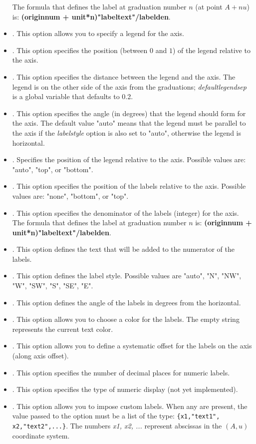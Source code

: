 \begin{itemize}
The formula that defines the label at graduation number $n$ (at point $A+nu$) is: \textbf{(originnum + unit*n)"labeltext"/labelden}.

    \item {}. This option allows you to specify a legend for the axis.
    \item {}. This option specifies the position (between $0$ and $1$) of the legend relative to the axis.
    \item {}. This option specifies the distance between the legend and the axis. The legend is on the other side of the axis from the graduations; \emph{defaultlegendsep} is a global variable that defaults to 0.2.
    \item {}. This option specifies the angle (in degrees) that the legend should form for the axis. The default value "auto" means that the legend must be parallel to the axis if the \emph{labelstyle} option is also set to "auto", otherwise the legend is horizontal.
    \item {}. Specifies the position of the legend relative to the axis. Possible values ​​are: "auto", "top", or "bottom".
    \item {}. This option specifies the position of the labels relative to the axis. Possible values ​​are: "none", "bottom", or "top".
    \item {}. This option specifies the denominator of the labels (integer) for the axis. The formula that defines the label at graduation number $n$ is: \textbf{(originnum + unit*n)"labeltext"/labelden}.
    \item {}. This option defines the text that will be added to the numerator of the labels.     \item {}. This option defines the label style. Possible values ​​are "auto", "N", "NW", "W", "SW", "S", "SE", "E".
    \item {}. This option defines the angle of the labels in degrees from the horizontal.
    \item {}. This option allows you to choose a color for the labels. The empty string represents the current text color.
    \item {}. This option allows you to define a systematic offset for the labels on the axis (along axis offset).
    \item {}. This option specifies the number of decimal places for numeric labels.
    \item {}. This option specifies the type of numeric display (not yet implemented).
    \item {}. This option allows you to impose custom labels. When any are present, the value passed to the option must be a list of the type: \verb|{x1,"text1", x2,"text2",...}|. The numbers \emph{x1, x2, ...} represent abscissas in the $(A,u)$ coordinate system.
\end{itemize}

